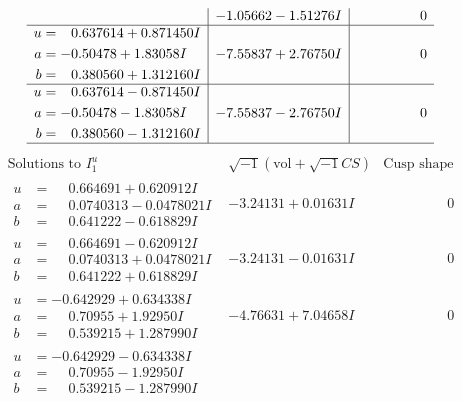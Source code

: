 \documentclass[1p]{elsarticle_modified}
\theoremstyle{definition}
\newcommand{\I}{\sqrt{-1}}
\begin{document}
$$\begin{array}{c|c|c}
 & -1.05662 - 1.51276 I & \phantom{-0.000000 } 0 \\ \hline\begin{aligned}
u &= \phantom{-}0.637614 + 0.871450 I \\
a &= -0.50478 + 1.83058 I \\
b &= \phantom{-}0.380560 + 1.312160 I\end{aligned}
 & -7.55837 + 2.76750 I & \phantom{-0.000000 } 0 \\ \hline\begin{aligned}
u &= \phantom{-}0.637614 - 0.871450 I \\
a &= -0.50478 - 1.83058 I \\
b &= \phantom{-}0.380560 - 1.312160 I\end{aligned}
 & -7.55837 - 2.76750 I & \phantom{-0.000000 } 0\\
 \hline 
 \end{array}$$\newpage$$\begin{array}{c|c|c}  
\text{Solutions to }I^u_{1}& \I (\text{vol} + \sqrt{-1}CS) & \text{Cusp shape}\\
 \hline 
\begin{aligned}
u &= \phantom{-}0.664691 + 0.620912 I \\
a &= \phantom{-}0.0740313 - 0.0478021 I \\
b &= \phantom{-}0.641222 - 0.618829 I\end{aligned}
 & -3.24131 + 0.01631 I & \phantom{-0.000000 } 0 \\ \hline\begin{aligned}
u &= \phantom{-}0.664691 - 0.620912 I \\
a &= \phantom{-}0.0740313 + 0.0478021 I \\
b &= \phantom{-}0.641222 + 0.618829 I\end{aligned}
 & -3.24131 - 0.01631 I & \phantom{-0.000000 } 0 \\ \hline\begin{aligned}
u &= -0.642929 + 0.634338 I \\
a &= \phantom{-}0.70955 + 1.92950 I \\
b &= \phantom{-}0.539215 + 1.287990 I\end{aligned}
 & -4.76631 + 7.04658 I & \phantom{-0.000000 } 0 \\ \hline\begin{aligned}
u &= -0.642929 - 0.634338 I \\
a &= \phantom{-}0.70955 - 1.92950 I \\
b &= \phantom{-}0.539215 - 1.287990 I\end{aligned}

\end{array}$$
\end{document}
